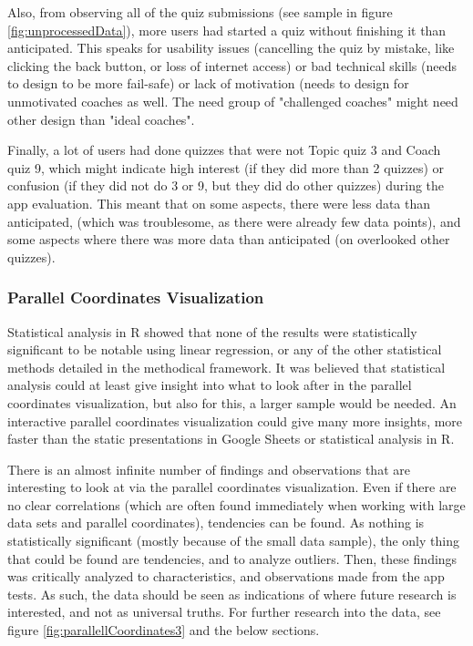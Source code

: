 Also, from observing all of the quiz submissions (see sample in figure \ref{fig:unprocessedData}), more users had started a quiz without finishing it than anticipated. This speaks for usability issues (cancelling the quiz by mistake, like clicking the back button, or loss of internet access) or bad technical skills (needs to design to be more fail-safe) or lack of motivation (needs to design for unmotivated coaches as well. The need group of "challenged coaches" might need other design than "ideal coaches".

Finally, a lot of users had done quizzes that were not Topic quiz 3 and Coach quiz 9, which might indicate high interest (if they did more than 2 quizzes) or confusion (if they did not do 3 or 9, but they did do other quizzes) during the app evaluation. This meant that on some aspects, there were less data than anticipated, (which was troublesome, as there were already few data points), and some aspects where there was more data than anticipated (on overlooked other quizzes).

\subsubsection{Parallel Coordinates Visualization}
Statistical analysis in R showed that none of the results were statistically significant to be notable using linear regression, or any of the other statistical methods detailed in the methodical framework. It was believed that statistical analysis could at least give insight into what to look after in the parallel coordinates visualization, but also for this, a larger sample would be needed. An interactive parallel coordinates visualization could give many more insights, more faster than the static presentations in Google Sheets or statistical analysis in R.

There is an almost infinite number of findings and observations that are interesting to look at via the parallel coordinates visualization. Even if there are no clear correlations (which are often found immediately when working with large data sets and parallel coordinates), tendencies can be found. As nothing is statistically significant (mostly because of the small data sample), the only thing that could be found are tendencies, and to analyze outliers. Then, these findings was critically analyzed to characteristics, and observations made from the app tests. As such, the data should be seen as indications of where future research is interested, and not as universal truths. For further research into the data, see figure \ref{fig:parallellCoordinates3} and the below sections.

